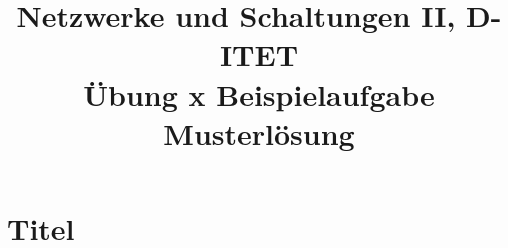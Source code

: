 \documentclass[11pt,a4paper]{article}
\title{\textbf{Netzwerke und Schaltungen II, D-ITET}\\[0.5cm]
       \textbf{\Huge Übung x Beispielaufgabe Musterlösung}\\[0.5cm]}
\date{\vspace{-5ex}}
\begin{document}
\maketitle
\section{Titel}
\end{document}

